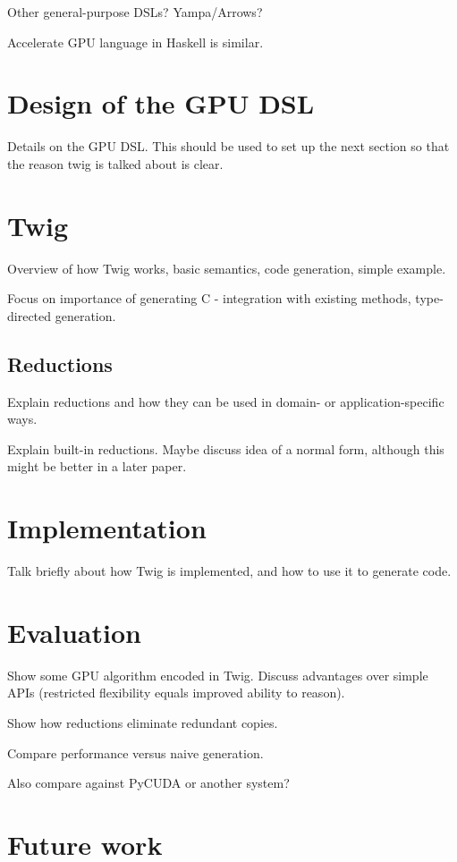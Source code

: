 \documentclass{acm_proc_article-sp}
\begin{document}
Other general-purpose DSLs? Yampa/Arrows?

Accelerate GPU language in Haskell is similar.  

\section{Design of the GPU DSL}

Details on the GPU DSL.  This should be used to set up the next section so
that the reason twig is talked about is clear.

\section{Twig}

Overview of how Twig works, basic semantics, code generation, simple example.

Focus on importance of generating C - integration with existing methods, type-directed generation.

\subsection{Reductions}

Explain reductions and how they can be used in domain- or application-specific
ways.

Explain built-in reductions. Maybe discuss idea of a normal form, although
this might be better in a later paper.

\section{Implementation}

Talk briefly about how Twig is implemented, and how to use it to generate
code.

\section{Evaluation}

Show some GPU algorithm encoded in Twig. Discuss advantages over simple APIs
(restricted flexibility equals improved ability to reason).

Show how reductions eliminate redundant copies.

Compare performance versus naive generation.

Also compare against PyCUDA or another system?

\section{Future work}
\end{document}
